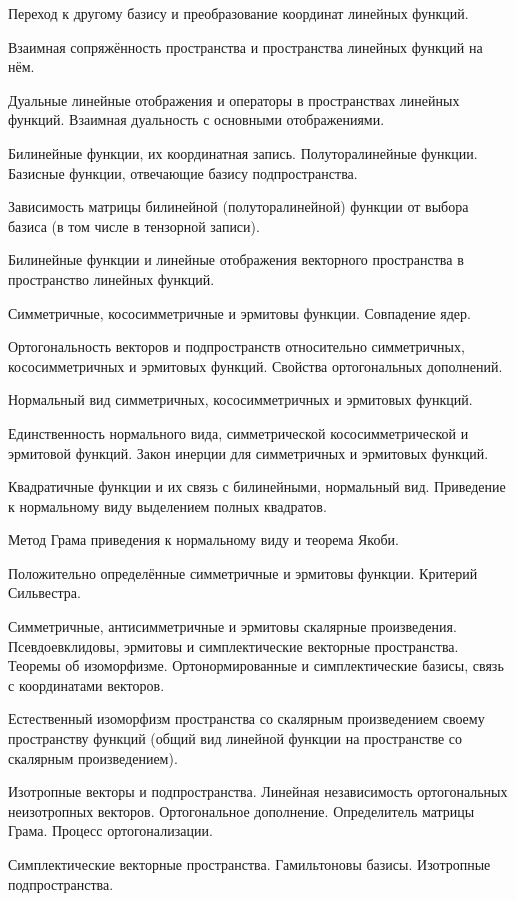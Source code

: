 \documentclass[a4paper]{article}
\begin{document}
\begin{nums}{-2}
 Переход к другому базису и преобразование координат линейных функций.
\item Взаимная сопряжённость пространства и пространства линейных функций на нём.
\item Дуальные линейные отображения и операторы в пространствах линейных функций.
Взаимная дуальность с основными отображениями.
\item Билинейные функции, их координатная запись. Полуторалинейные функции.
Базисные функции, отвечающие базису подпространства.
\item Зависимость матрицы билинейной (полуторалинейной) функции от выбора базиса
(в том числе в тензорной записи).
\item Билинейные функции и линейные отображения векторного пространства в пространство линейных функций.
\item Симметричные, кососимметричные и эрмитовы функции. Совпадение ядер.
\item Ортогональность векторов и подпространств относительно симметричных, кососимметричных
и эрмитовых функций. Свойства ортогональных дополнений.
\item Нормальный вид симметричных, кососимметричных и эрмитовых функций.
\item Единственность нормального вида, симметрической кососимметрической и эрмитовой функций.
Закон инерции для симметричных и эрмитовых функций.
\item Квадратичные функции и их связь с билинейными, нормальный вид.
Приведение к нормальному виду выделением полных квадратов.
\item Метод Грама приведения к нормальному виду и теорема Якоби.
\item Положительно определённые симметричные и эрмитовы функции.
Критерий Сильвестра.
\item Симметричные, антисимметричные и эрмитовы скалярные произведения. Псевдоевклидовы,
эрмитовы и симплектические векторные пространства. Теоремы об изоморфизме.
Ортонормированные и симплектические базисы, связь с координатами векторов.
\item Естественный изоморфизм пространства со скалярным произведением своему пространству функций
(общий вид линейной функции на пространстве со скалярным произведением).
\item Изотропные векторы и подпространства. Линейная независимость ортогональных неизотропных векторов.
 Ортогональное дополнение. Определитель матрицы Грама. Процесс ортогонализации.
\item Симплектические векторные пространства. Гамильтоновы базисы. Изотропные подпространства.

\end{nums}
\end{document}
